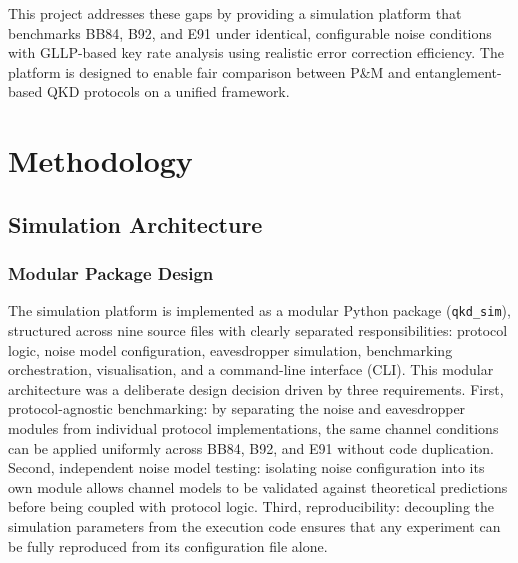 \documentclass[10pt, a4paper]{report}
\begin{document}
This project addresses these gaps by providing a simulation platform that benchmarks BB84, B92, and E91 under identical, configurable noise conditions with GLLP-based key rate analysis using realistic error correction efficiency. The platform is designed to enable fair comparison between P\&M and entanglement-based QKD protocols on a unified framework.





\chapter{Methodology}

\section{Simulation Architecture}


\subsection{Modular Package Design}

The simulation platform is implemented as a modular Python package (\texttt{qkd\_sim}), structured across nine source files with clearly separated responsibilities: protocol logic, noise model configuration, eavesdropper simulation, benchmarking orchestration, visualisation, and a command-line interface (CLI). This modular architecture was a deliberate design decision driven by three requirements. First, protocol-agnostic benchmarking: by separating the noise and eavesdropper modules from individual protocol implementations, the same channel conditions can be applied uniformly across BB84, B92, and E91 without code duplication. Second, independent noise model testing: isolating noise configuration into its own module allows channel models to be validated against theoretical predictions before being coupled with protocol logic. Third, reproducibility: decoupling the simulation parameters from the execution code ensures that any experiment can be fully reproduced from its configuration file alone.
\end{document}
